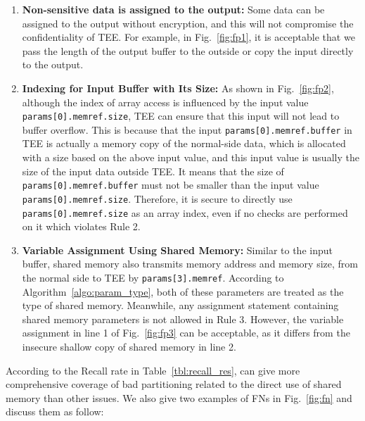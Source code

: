 \begin{enumerate}
    \item \textbf{Non-sensitive data is assigned to the output:} Some data can be assigned to the output without encryption, and this will not compromise the confidentiality of TEE. For example, in Fig.~\ref{fig:fp1}, it is acceptable that we pass the length of the output buffer to the outside or copy the input directly to the output.
    \item \textbf{Indexing for Input Buffer with Its Size:} As shown in Fig.~\ref{fig:fp2}, although the index of array access is influenced by the input value \texttt{params[0].memref.size}, TEE can ensure that this input will not lead to buffer overflow. This is because that the input \texttt{params[0].memref.buffer} in TEE is actually a memory copy of the normal-side data, which is allocated with a size based on the above input value, and this input value is usually the size of the input data outside TEE. It means that the size of \texttt{params[0].memref.buffer} must not be smaller than the input value \texttt{params[0].memref.size}. Therefore, it is secure to directly use \texttt{params[0].memref.size} as an array index, even if no checks are performed on it which violates Rule 2.
    \item \textbf{Variable Assignment Using Shared Memory:} Similar to the input buffer, shared memory also transmits memory address and memory size, from the normal side to TEE by \texttt{params[3].memref}. According to Algorithm~\ref{algo:param_type}, both of these parameters are treated as the type of shared memory. Meanwhile, any assignment statement containing shared memory parameters is not allowed in Rule 3. However, the variable assignment in line 1 of Fig.~\ref{fig:fp3} can be acceptable, as it differs from the insecure shallow copy of shared memory in line 2.
\end{enumerate}

According to the Recall rate in Table~\ref{tbl:recall_res}, \ccSysName can give more comprehensive coverage of bad partitioning related to the direct use of shared memory than other issues.
We also give two examples of FNs in Fig.~\ref{fig:fn} and discuss them as follow:

